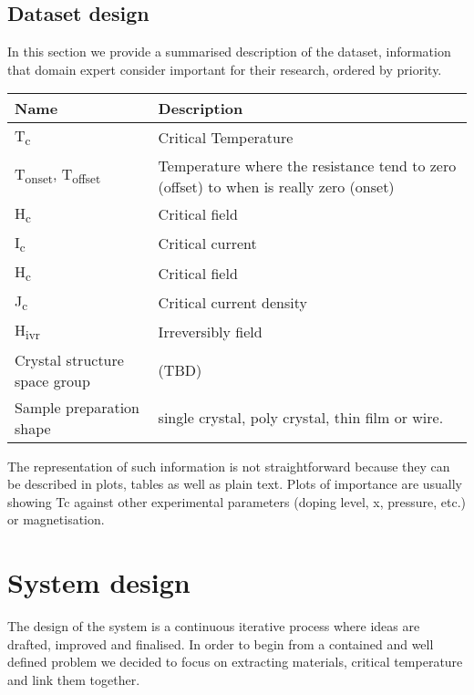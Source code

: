 \documentclass{article}
\begin{document}
\subsection{Dataset design}
In this section we provide a summarised description of the dataset, information that domain expert consider important for their research, ordered by priority. 

\begin{center}
    \begin{tabular}{ | m{5em} | m{8cm}| } 
    \hline
        Name & Description  \\ [0.5ex] 
    \hline\hline
        T\textsubscript{c} & Critical Temperature\\ 
    \hline
        T\textsubscript{onset}, T\textsubscript{offset} & Temperature where the resistance tend to zero (offset) to when is really zero (onset)\\ 
    \hline
        H\textsubscript{c} & Critical field\\ 
    \hline
        I\textsubscript{c} & Critical current\\
    \hline
        H\textsubscript{c} & Critical field\\ 
    \hline
        J\textsubscript{c} & Critical current density\\ 
    \hline
        H\textsubscript{ivr} & Irreversibly field\\
    \hline
        Crystal structure space group & (TBD) \\
    \hline
        Sample preparation shape & single crystal, poly crystal, thin film or wire. \\
    \hline    
    \end{tabular}
\end{center}

The representation of such information is not straightforward because they can be described in plots, tables as well as plain text. Plots of importance are usually showing Tc against other experimental parameters (doping level, x, pressure, etc.) or magnetisation. 

\section{System design}
The design of the system is a continuous iterative process where ideas are drafted, improved and finalised. In order to begin from a contained and well defined problem we decided to focus on extracting materials, critical temperature and link them together. 
\end{document}

